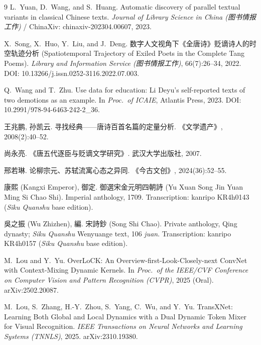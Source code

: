 \documentclass[11pt]{article}
\begin{document}
\begin{thebibliography}{9}
L.~Yuan, D.~Wang, and S.~Huang.
\newblock Automatic discovery of parallel textual variants in classical
Chinese texts.
\newblock \emph{Journal of Library Science in China (图书情报工作)} /
ChinaXiv: chinaxiv-202304.00607, 2023.

X.~Song, X.~Huo, Y.~Liu, and J.~Deng.
\newblock 数字人文视角下《全唐诗》贬谪诗人的时空轨迹分析 (Spatiotemporal
Trajectory of Exiled Poets in the Complete Tang Poems).
\newblock \emph{Library and Information Service (图书情报工作)}, 66(7):26--34,
2022. DOI: 10.13266/j.issn.0252-3116.2022.07.003.

Q.~Wang and T.~Zhu.
\newblock Use data for education: Li Deyu's self-reported texts of two
demotions as an example.
\newblock In \emph{Proc.\ of ICAIE}, Atlantis Press, 2023.
DOI: 10.2991/978-94-6463-242-2\_36.

王兆鹏, 孙凯云.
\newblock 寻找经典——唐诗百首名篇的定量分析.
\newblock 《文学遗产》, 2008(2):40--52.

尚永亮.
\newblock 《唐五代逐臣与贬谪文学研究》.
\newblock 武汉大学出版社, 2007.

邢若琳.
\newblock 论柳宗元、苏轼流寓心态之异同.
\newblock 《今古文创》, 2024(36):52--55.

康熙 (Kangxi Emperor), 御定.
\newblock 御選宋金元明四朝詩 (Yu Xuan Song Jin Yuan Ming Si Chao Shi).
\newblock Imperial anthology, 1709. Transcription: kanripo KR4h0143
(\emph{Siku Quanshu} base edition).

吳之振 (Wu Zhizhen), 編.
\newblock 宋詩鈔 (Song Shi Chao).
\newblock Private anthology, Qing dynasty; \emph{Siku Quanshu} Wenyuange text,
106 \emph{juan}. Transcription: kanripo KR4h0157 (\emph{Siku Quanshu} base
edition).

M.~Lou and Y.~Yu.
\newblock OverLoCK: An Overview-first-Look-Closely-next ConvNet with
Context-Mixing Dynamic Kernels.
\newblock In \emph{Proc.\ of the IEEE/CVF Conference on Computer Vision and
Pattern Recognition (CVPR)}, 2025 (Oral). arXiv:2502.20087.

M.~Lou, S.~Zhang, H.-Y.~Zhou, S.~Yang, C.~Wu, and Y.~Yu.
\newblock TransXNet: Learning Both Global and Local Dynamics with a Dual Dynamic
Token Mixer for Visual Recognition.
\newblock \emph{IEEE Transactions on Neural Networks and Learning Systems
(TNNLS)}, 2025. arXiv:2310.19380.


\end{thebibliography}
\end{document}
